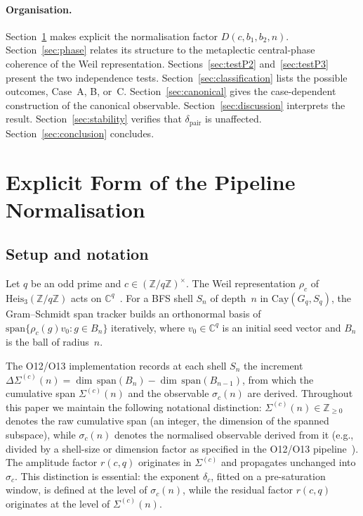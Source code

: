 \documentclass[11pt,a4paper]{article}
\theoremstyle{remark}
\newcommand{\dpair}{\delta_{\mathrm{pair}}}
\newcommand{\dc}{\delta_{c}}
\newcommand{\rcq}{r(c,q)}
\newcommand{\Heis}{\mathrm{Heis}_{3}(\mathbb{Z}/q\mathbb{Z})}
\begin{document}
  \paragraph{Organisation.}
    Section~\ref{sec:pipeline} makes explicit the normalisation factor
    $D(c, b_{1}, b_{2}, n)$.
    Section~\ref{sec:phase} relates its structure to the metaplectic central-phase
    coherence of the Weil representation.
    Sections~\ref{sec:testP2} and~\ref{sec:testP3} present the two independence
    tests.
    Section~\ref{sec:classification} lists the possible outcomes, Case~A, B, or~C.
    Section~\ref{sec:canonical} gives the case-dependent construction of the canonical observable.
    Section~\ref{sec:discussion} interprets the result.
    Section~\ref{sec:stability} verifies that $\dpair$ is unaffected.
    Section~\ref{sec:conclusion} concludes.

  \section{Explicit Form of the Pipeline Normalisation}
  \label{sec:pipeline}

  \subsection{Setup and notation}

    Let $q$ be an odd prime and $c \in (\mathbb{Z}/q\mathbb{Z})^{\times}$.
    The Weil representation $\rho_{c}$ of $\Heis$ acts on
    $\mathbb{C}^{q}$~\cite{Beau2026a20,Beau2026a21}.
    For a BFS shell $S_{n}$ of depth~$n$ in $\mathrm{Cay}(G_{q}, S_{q})$, the
    Gram--Schmidt span tracker builds an orthonormal basis of
    $\mathrm{span}\{\rho_{c}(g)v_{0} : g \in B_{n}\}$ iteratively, where
    $v_{0} \in \mathbb{C}^{q}$ is an initial seed vector and $B_{n}$ is the
    ball of radius~$n$.

    The O12/O13 implementation records at each shell $S_{n}$ the increment
    $\Delta\Sigma^{(c)}(n) = \dim\,\mathrm{span}(B_{n}) - \dim\,\mathrm{span}(B_{n-1})$,
    from which the cumulative span $\Sigma^{(c)}(n)$ and the observable
    $\sigma_{c}(n)$ are derived.
    Throughout this paper we maintain the following notational distinction:
    $\Sigma^{(c)}(n) \in \mathbb{Z}_{\geq 0}$ denotes the raw cumulative span (an integer,
    the dimension of the spanned subspace), while $\sigma_{c}(n)$ denotes the
    normalised observable derived from it (e.g., divided by a shell-size or
    dimension factor as specified in the O12/O13 pipeline~\cite{Beau2026a16}).
    The amplitude factor $\rcq$ originates in $\Sigma^{(c)}$ and propagates unchanged
    into $\sigma_{c}$.
    This distinction is essential: the exponent $\dc$, fitted on a pre-saturation window, is defined at the level
    of $\sigma_{c}(n)$, while the residual factor $\rcq$ originates at the level of
    $\Sigma^{(c)}(n)$.
\end{document}
